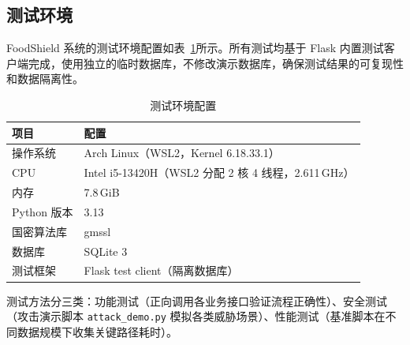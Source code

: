 \subsection{测试环境}

FoodShield 系统的测试环境配置如表~\ref{tab:test_env}所示。所有测试均基于 Flask 内置测试客户端完成，使用独立的临时数据库，不修改演示数据库，确保测试结果的可复现性和数据隔离性。

\begin{table}[H]
\centering
\caption{测试环境配置}
\label{tab:test_env}
\begin{tabular}{ll}
\hline
\textbf{项目} & \textbf{配置} \\
\hline
操作系统 & Arch Linux（WSL2，Kernel 6.18.33.1） \\
CPU & Intel i5-13420H（WSL2 分配 2 核 4 线程，2.611\,GHz） \\
内存 & 7.8\,GiB \\
Python 版本 & 3.13 \\
国密算法库 & gmssl \\
数据库 & SQLite 3 \\
测试框架 & Flask test client（隔离数据库） \\
\hline
\end{tabular}
\end{table}

测试方法分三类：功能测试（正向调用各业务接口验证流程正确性）、安全测试（攻击演示脚本 \texttt{attack\_demo.py} 模拟各类威胁场景）、性能测试（基准脚本在不同数据规模下收集关键路径耗时）。

